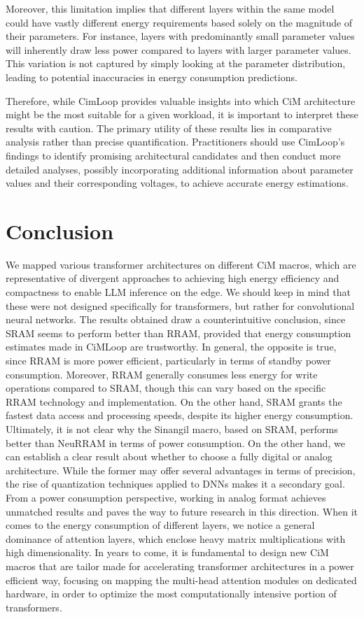 \documentclass[conference]{IEEEtran}
\begin{document}
Moreover, this limitation implies that different layers within the same model could have vastly different energy requirements based solely on the magnitude of their parameters. For instance, layers with predominantly small parameter values will inherently draw less power compared to layers with larger parameter values. This variation is not captured by simply looking at the parameter distribution, leading to potential inaccuracies in energy consumption predictions.

Therefore, while CimLoop provides valuable insights into which CiM architecture might be the most suitable for a given workload, it is important to interpret these results with caution. The primary utility of these results lies in comparative analysis rather than precise quantification. Practitioners should use CimLoop’s findings to identify promising architectural candidates and then conduct more detailed analyses, possibly incorporating additional information about parameter values and their corresponding voltages, to achieve accurate energy estimations.
\section{Conclusion}
We mapped various transformer architectures on different CiM macros, which are representative of divergent approaches to achieving high energy efficiency and compactness to enable LLM inference on the edge. We should keep in mind that these were not designed specifically for transformers, but rather for convolutional neural networks. The results obtained draw a counterintuitive conclusion, since SRAM seems to perform better than RRAM, provided that energy consumption estimates made in CiMLoop are trustworthy. In general, the opposite is true, since RRAM is more power efficient, particularly in terms of standby power consumption. Moreover, RRAM generally consumes less energy for write operations compared to SRAM, though this can vary based on the specific RRAM technology and implementation. On the other hand, SRAM grants the fastest data access and processing speeds, despite its higher energy consumption. Ultimately, it is not clear why the Sinangil macro, based on SRAM, performs better than NeuRRAM in terms of power consumption. On the other hand, we can establish a clear result about whether to choose a fully digital or analog architecture. While the former may offer several advantages in terms of precision, the rise of quantization techniques applied to DNNs makes it a secondary goal. From a power consumption perspective, working in analog format achieves unmatched results and paves the way to future research in this direction. 
When it comes to the energy consumption of different layers, we notice a general dominance of attention layers, which enclose heavy matrix multiplications with high dimensionality. In years to come, it is fundamental to design new CiM macros that are tailor made for accelerating transformer architectures in a power efficient way, focusing on mapping the multi-head attention modules on dedicated hardware, in order to optimize the most computationally intensive portion of transformers.
\end{document}
